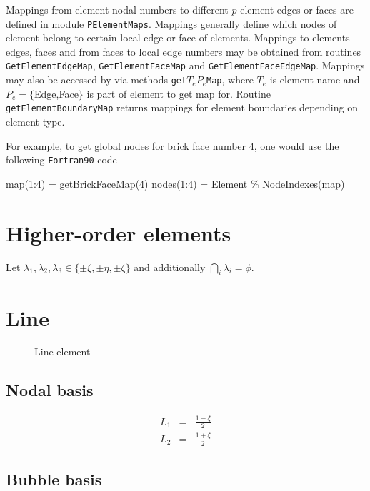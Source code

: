 Mappings from element nodal numbers to different $p$ element edges or faces are defined in module \texttt{PElementMaps}. Mappings generally define which nodes of element belong to certain local edge or face of elements. Mappings to elements edges, faces and from faces to local edge numbers may be obtained from routines \texttt{GetElementEdgeMap}, \texttt{GetElementFaceMap} and \texttt{GetElementFaceEdgeMap}. Mappings may also be accessed by via methods \texttt{get}$T_e$$P_e$\texttt{Map}, where $T_e$ is element name and $P_e=\{$Edge,Face$\}$ is part of element to get map for. Routine \texttt{getElementBoundaryMap} returns mappings for element boundaries depending on element type. 

For example, to get global nodes for brick face number $4$, one would use the following \texttt{Fortran90} code

\ttbegin
map(1:4) = getBrickFaceMap(4)
nodes(1:4) = Element \% NodeIndexes(map)
\ttend

\section{Higher-order elements}

\label{app:pbasis}

Let $\lambda_1,\lambda_2,\lambda_3 \in \{\pm\xi,\pm\eta,\pm\zeta \}$
and additionally $\bigcap_i\lambda_i=\phi$. 

\section{Line}

\begin{figure}[tbhp]
\begin{center}

\caption{Line element}
\end{center}
\end{figure}

\subsection{Nodal basis}

\begin{eqnarray*}
L_1&=&\frac{1-\xi}{2} \\
L_2&=&\frac{1+\xi}{2}
\end{eqnarray*}

\subsection{Bubble basis}

